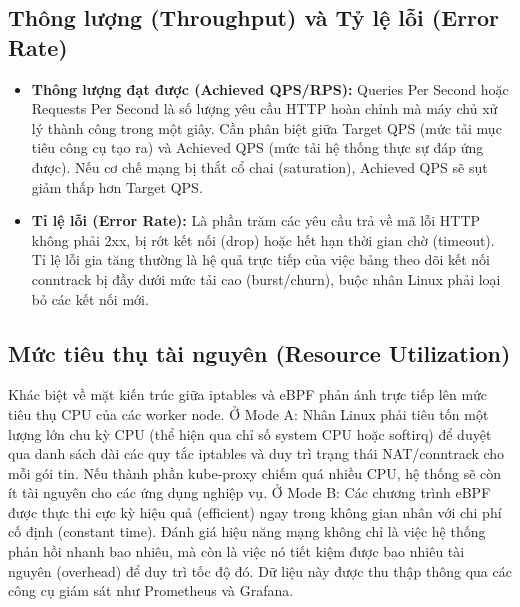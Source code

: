 \subsection{Thông lượng (Throughput) và Tỷ lệ lỗi (Error Rate)}
\begin{itemize}
    \item \textbf{Thông lượng đạt được (Achieved QPS/RPS):} Queries Per Second hoặc Requests Per Second là số lượng yêu cầu HTTP hoàn chỉnh mà 
máy chủ xử lý thành công trong một giây. Cần phân biệt giữa Target QPS (mức tải mục tiêu công cụ tạo ra) và Achieved QPS 
(mức tải hệ thống thực sự đáp ứng được). Nếu cơ chế mạng bị thắt cổ chai (saturation), Achieved QPS sẽ sụt giảm thấp hơn 
Target QPS.
    \item \textbf{Tỉ lệ lỗi (Error Rate):} Là phần trăm các yêu cầu trả về mã lỗi HTTP không phải 2xx, bị rớt kết nối (drop) hoặc hết hạn thời gian chờ (timeout). Tỉ lệ lỗi gia tăng thường là hệ quả trực tiếp của việc bảng theo dõi kết nối conntrack bị đầy dưới mức tải cao (burst/churn), buộc nhân Linux phải loại bỏ các kết nối mới.


\end{itemize}

\subsection{Mức tiêu thụ tài nguyên (Resource Utilization)}
Khác biệt về mặt kiến trúc giữa iptables và eBPF phản ánh trực tiếp lên mức tiêu thụ CPU của các worker node.
Ở Mode A: Nhân Linux phải tiêu tốn một lượng lớn chu kỳ CPU (thể hiện qua chỉ số system CPU hoặc softirq) để duyệt qua danh sách
 dài các quy tắc iptables và duy trì trạng thái NAT/conntrack cho mỗi gói tin. Nếu thành phần kube-proxy chiếm quá nhiều CPU, hệ thống sẽ còn ít tài nguyên cho các ứng dụng nghiệp vụ.
Ở Mode B: Các chương trình eBPF được thực thi cực kỳ hiệu quả (efficient) ngay trong không gian nhân với chi phí cố định (constant time). Đánh giá hiệu năng mạng không chỉ là việc hệ thống phản hồi nhanh bao nhiêu, mà còn là việc nó tiết kiệm được bao nhiêu tài nguyên (overhead) để duy trì tốc độ đó. Dữ liệu này được thu thập thông qua các công cụ giám sát như Prometheus và Grafana.
